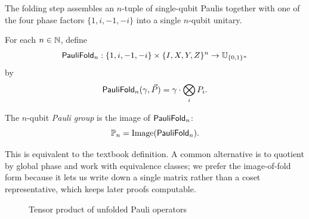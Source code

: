 The folding step assembles an $n$-tuple of single-qubit Paulis together with one
of the four phase factors $\{1, i, -1, -i\}$ into a single $n$-qubit unitary.
\begin{definition}
    \label{def:pauli-folding}
    For each $n \in \mathbb{N}$, define
    $$\mathsf{PauliFold}_n : \{1, i, -1, -i\} \times \{I, X, Y, Z\}^n \rightarrow
    \mathbb{U}_{\{0,1\}^n}$$
    by
    \begin{equation}
        \label{eq:def-pauli-fold}
        \mathsf{PauliFold}_n(\gamma, \vec{P}) = \gamma \cdot \bigotimes_i P_i.
    \end{equation}
\end{definition}
\begin{definition}
    \label{def:pauli-group}
    The $n$-qubit \emph{Pauli group} is the image of $\mathsf{PauliFold}_n$:
    \begin{equation}
        \label{eq:def-pauli-group}
        \mathbb{P}_n = \operatorname{Image}(\mathsf{PauliFold}_n).
    \end{equation}
\end{definition}
This is equivalent to the textbook definition. A common alternative is to
quotient by global phase and work with equivalence classes; we prefer the
image-of-fold form because it lets us write down a single matrix rather than a
coset representative, which keeps later proofs computable.

\begin{figure}
    \centering
    \caption{Tensor product of unfolded Pauli operators}
    \label{fig:pauli-commute}
\end{figure}

